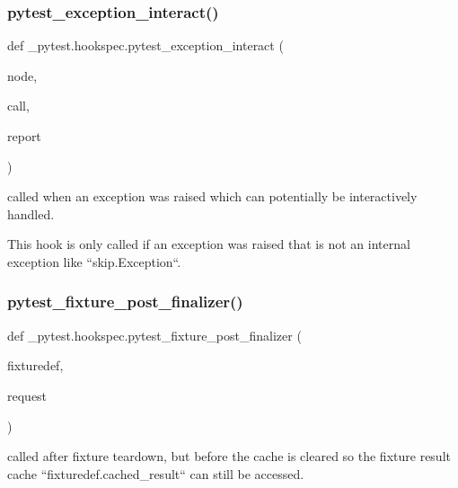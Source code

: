 \subsubsection{\texorpdfstring{pytest\+\_\+exception\+\_\+interact()}{pytest\_exception\_interact()}}
{\footnotesize\ttfamily def \+\_\+pytest.\+hookspec.\+pytest\+\_\+exception\+\_\+interact (\begin{DoxyParamCaption}\item[{}]{node,  }\item[{}]{call,  }\item[{}]{report }\end{DoxyParamCaption})}

\begin{DoxyVerb}called when an exception was raised which can potentially be
interactively handled.

This hook is only called if an exception was raised
that is not an internal exception like ``skip.Exception``.
\end{DoxyVerb}
 \mbox{\label{namespace__pytest_1_1hookspec_a9ae34ba449799bf389f5bd44f53af41b}} 
\subsubsection{\texorpdfstring{pytest\+\_\+fixture\+\_\+post\+\_\+finalizer()}{pytest\_fixture\_post\_finalizer()}}
{\footnotesize\ttfamily def \+\_\+pytest.\+hookspec.\+pytest\+\_\+fixture\+\_\+post\+\_\+finalizer (\begin{DoxyParamCaption}\item[{}]{fixturedef,  }\item[{}]{request }\end{DoxyParamCaption})}

\begin{DoxyVerb}called after fixture teardown, but before the cache is cleared so
the fixture result cache ``fixturedef.cached_result`` can
still be accessed.\end{DoxyVerb}
 \mbox{\label{namespace__pytest_1_1hookspec_a55f8324bbd5d1d8d0bc99275e255a487}} 
